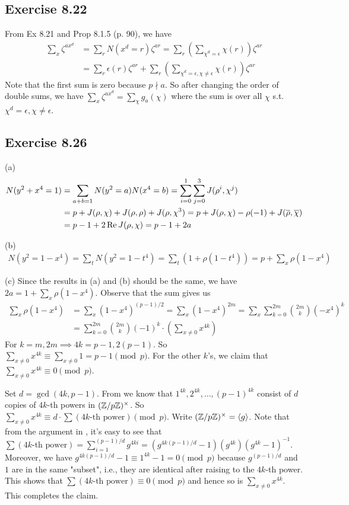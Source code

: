 \documentclass[../I&R.tex]{subfiles}
\begin{document}
\subsection*{Exercise 8.22}

From Ex 8.21 and Prop 8.1.5 (p. 90), we have
\begin{align*}
\sum_x \zeta^{ax^d} &= \sum_r N(x^d=r)\zeta^{ar} = \sum_r \left(\sum_{\chi^d=\epsilon} \chi(r)\right)\zeta^{ar} \\
&= \sum_r \epsilon(r)\zeta^{ar} + \sum_r\left(\sum_{\chi^d=\epsilon,\chi\neq\epsilon} \chi(r)\right)\zeta^{ar}
\end{align*}
Note that the first sum is zero because $p\nmid a$. So after changing the order of double sums, we have $\sum_x \zeta^{ax^d} = \sum_\chi g_a(\chi)$ where the sum is over all $\chi$ s.t. $\chi^d=\epsilon,\chi\neq\epsilon$.

\subsection*{Exercise 8.26}

(a) \begin{align*}
N(y^2+x^4=1) &= \sum_{a+b=1} N(y^2=a)N(x^4=b) = \sum_{i=0}^1\sum_{j=0}^3 J(\rho^i,\chi^j) \\
&= p+J(\rho,\chi)+J(\rho,\rho)+J(\rho,\chi^3) = p+J(\rho,\chi)-\rho(-1)+J(\overline{\rho},\overline{\chi}) \\
&= p-1+2\operatorname{Re} J(\rho,\chi) = p-1+2a
\end{align*}

(b) \begin{align*}
N(y^2=1-x^4) = \sum_t N(y^2=1-t^4) = \sum _t (1+\rho(1-t^4)) = p+\sum_x \rho(1-x^4)
\end{align*}

(c) Since the results in (a) and (b) should be the same, we have $2a=1+\sum_x \rho(1-x^4)$. Observe that the sum gives us
\begin{align*}
\sum_x \rho(1-x^4) &= \sum_x (1-x^4)^{(p-1)/2} = \sum_x (1-x^4)^{2m} = \sum_x \sum_{k=0}^{2m} \binom{2m}{k}(-x^4)^k \\
&= \sum_{k=0}^{2m}\binom{2m}{k}(-1)^k\cdot\left(\sum_{x\neq0} x^{4k}\right)
\end{align*}
For $k=m,2m\implies 4k=p-1,2(p-1)$. So $\sum_{x\neq0} x^{4k}\equiv\sum_{x\neq0} 1 = p-1 \pmod{p}$. For the other $k$'s, we claim that $\sum_{x\neq0} x^{4k}\equiv0\pmod{p}$.

Set $d=\gcd(4k,p-1)$. From  we know that $1^{4k},2^{4k},\ldots,(p-1)^{4k}$ consist of $d$ copies of $4k$-th powers in $(\mathbb{Z}/p\mathbb{Z})^\times$. So $\sum_{x\neq0} x^{4k}\equiv d\cdot\sum (4k\text{-th power}) \pmod{p}$. Write $(\mathbb{Z}/p\mathbb{Z})^\times=\langle g\rangle$. Note that from the argument in , it's easy to see that $\sum (4k\text{-th power}) = \sum_{i=1}^{(p-1)/d} g^{4ki} = (g^{4k(p-1)/d}-1)(g^{4k})(g^{4k}-1)^{-1}$. Moreover, we have $g^{4k(p-1)/d}-1\equiv 1^{4k}-1=0\pmod{p}$ because $g^{(p-1)/d}$ and $1$ are in the same "subset", i.e., they are identical after raising to the $4k$-th power. This shows that $\sum (4k\text{-th power}) \equiv0\pmod{p}$ and hence so is $\sum_{x\neq0} x^{4k}$. This completes the claim.
\end{document}
